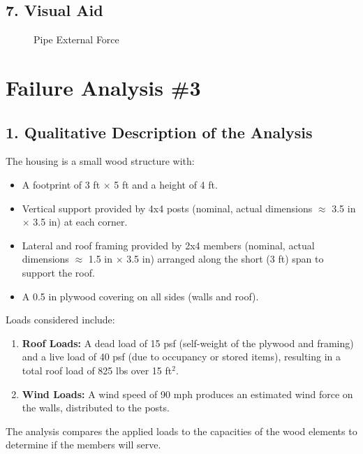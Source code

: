 \documentclass[12pt]{article}
\begin{document}
\subsection*{7. Visual Aid}
\begin{figure}[!ht]
\centering
{}%

\label{fig:inpo_pipe}
\caption{Pipe External Force}
\end{figure}
\newpage
\section*{Failure Analysis \#3}

\subsection*{1. Qualitative Description of the Analysis}
The housing is a small wood structure with:
\begin{itemize}
    \item A footprint of 3 ft $\times$ 5 ft and a height of 4 ft.
    \item Vertical support provided by 4x4 posts (nominal, actual dimensions $\approx$ 3.5 in $\times$ 3.5 in) at each corner.
    \item Lateral and roof framing provided by 2x4 members (nominal, actual dimensions $\approx$ 1.5 in $\times$ 3.5 in) arranged along the short (3 ft) span to support the roof.
    \item A 0.5 in plywood covering on all sides (walls and roof).
\end{itemize}
Loads considered include:
\begin{enumerate}
    \item \textbf{Roof Loads:} A dead load of 15 psf (self-weight of the plywood and framing) and a live load of 40 psf (due to occupancy or stored items), resulting in a total roof load of 825 lbs over 15 ft\(^2\).
    \item \textbf{Wind Loads:} A wind speed of 90 mph produces an estimated wind force on the walls, distributed to the posts.
\end{enumerate}
The analysis compares the applied loads to the capacities of the wood elements to determine if the members will serve.
\end{document}
